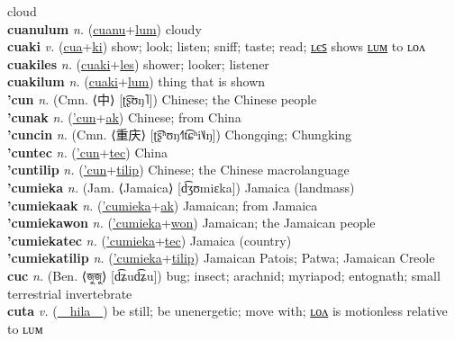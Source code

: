 cloud \label{cuanules} \\
\textbf{cuanulum} \textit{n.} (\hyperref[cuanu]{cuanu}+\hyperref[lum]{lum})
cloudy \label{cuanulum} \\
\textbf{cuaki} \textit{v.} (\hyperref[cua]{cua}+\hyperref[ki]{ki})
show; look; listen; sniff; taste; read; \hyperref[cuakiles]{ʟєꜱ} shows \hyperref[cuakilum]{ʟᴜᴍ} to ʟᴏᴧ \label{cuaki} \\
\textbf{cuakiles} \textit{n.} (\hyperref[cuaki]{cuaki}+\hyperref[les]{les})
shower; looker; listener \label{cuakiles} \\
\textbf{cuakilum} \textit{n.} (\hyperref[cuaki]{cuaki}+\hyperref[lum]{lum})
thing that is shown \label{cuakilum} \\
\textbf{'cun} \textit{n.} (Cmn. ⟨中⟩ [ʈ͡ʂʊŋ˥])
Chinese; the Chinese people \label{'cun} \\
\textbf{'cunak} \textit{n.} (\hyperref['cun]{'cun}+\hyperref[ak]{ak})
Chinese; from China \label{'cunak} \\
\textbf{'cuncin} \textit{n.} (Cmn. ⟨重庆⟩ [ʈ͡ʂʰʊŋ˧˥t͡ɕʰi˥˩ŋ])
Chongqing; Chungking \label{'cuncin} \\
\textbf{'cuntec} \textit{n.} (\hyperref['cun]{'cun}+\hyperref[tec]{tec})
China \label{'cuntec} \\
\textbf{'cuntilip} \textit{n.} (\hyperref['cun]{'cun}+\hyperref[tilip]{tilip})
Chinese; the Chinese macrolanguage \label{'cuntilip} \\
\textbf{'cumieka} \textit{n.} (Jam. ⟨Jamaica⟩ [d͡ʒʊmiɛka])
Jamaica (landmass) \label{'cumieka} \\
\textbf{'cumiekaak} \textit{n.} (\hyperref['cumieka]{'cumieka}+\hyperref[ak]{ak})
Jamaican; from Jamaica \label{'cumiekaak} \\
\textbf{'cumiekawon} \textit{n.} (\hyperref['cumieka]{'cumieka}+\hyperref[won]{won})
Jamaican; the Jamaican people \label{'cumiekawon} \\
\textbf{'cumiekatec} \textit{n.} (\hyperref['cumieka]{'cumieka}+\hyperref[tec]{tec})
Jamaica (country) \label{'cumiekatec} \\
\textbf{'cumiekatilip} \textit{n.} (\hyperref['cumieka]{'cumieka}+\hyperref[tilip]{tilip})
Jamaican Patois; Patwa; Jamaican Creole \label{'cumiekatilip} \\
\textbf{cuc} \textit{n.} (Ben. ⟨জুজু⟩ [d͡ʑud͡ʑu])
bug; insect; arachnid; myriapod; entognath; small terrestrial invertebrate \label{cuc} \\
\textbf{cuta} \textit{v.} (\hyperref[hila]{~~hila~~})
be still; be unenergetic; move with; \hyperref[cutalon]{ʟᴏᴧ} is motionless relative to ʟᴜᴍ \label{cuta} \\
